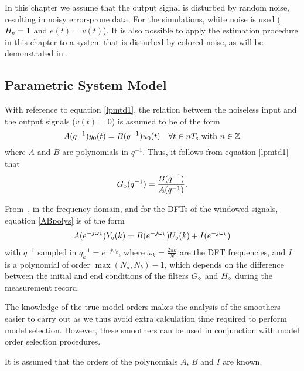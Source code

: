 In this chapter we assume that the output signal is disturbed by random noise, resulting in noisy error-prone data.
For the simulations, white noise is used (${H}_{\circ} = 1$ and $e(t) = v(t)$).
It is also possible to apply the estimation procedure in this chapter to a system that is disturbed by colored noise, as will be demonstrated in . 

\subsection{Parametric System Model}

With reference to equation \eqref{lpmtd1}, the relation between the noiseless input and the output signals ($v(t)= 0$) is assumed to be of the form
\begin{equation}
    A(q^{-1}) y_0(t) = B(q^{-1}) u_0(t) \quad \forall t \in n T_{\mathrm{s}}{}  \text{ with }  n \in \mathbb{Z}
\label{ABpolys}
\end{equation}
where $A$ and $B$ are polynomials in $q^{-1}$. 
Thus, it follows from equation \eqref{lpmtd1} that
\begin{equation}
    {G}_{\circ}(q^{-1})= \frac{B(q^{-1})}{A(q^{-1})}
    \text{.}
\end{equation}

From~\citet[Section 6.3.2.]{Pintelon2012}, in the frequency domain, and for the \glspl{DFT} of the windowed signals, equation \eqref{ABpolys} is of the form
\begin{align}
A(e^{-j\omega_k}){Y}_{\circ}(k) = B(e^{-j\omega_k}){U}_{\circ}(k) + I(e^{-j\omega_k})
\label{DFTspectra}
\end{align}
with $q^{-1}$ sampled in  $q_k^{-1} = e^{-j\omega_k}$, where $\omega_k = \frac{2\pi k}{N}$ are the \gls{DFT} frequencies, and $I$ is a polynomial of order $\max(N_a,N_b) - 1$, which depends on the difference between the initial and end conditions of the filters ${G}_{\circ}$ and ${H}_{\circ}$ during the measurement record.

\begin{remark}
The knowledge of the true model orders makes the analysis of the smoothers easier to carry out as we thus avoid extra calculation time required to perform model selection.
However, these smoothers can be used in conjunction with model order selection procedures.
\end{remark}

\begin{assumption}
It is assumed that the orders of the polynomials $A$, $B$ and $I$ are known.
\end{assumption}


